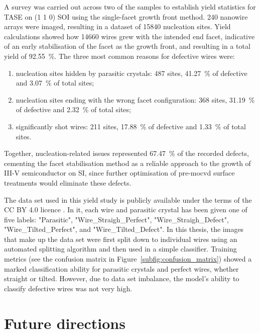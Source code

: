 A survey was carried out across two of the samples to establish yield statistics for \acs{TASE} on \hkl(1 1 0) \acs{SOI} using the single-facet  growth front method. \num{240} nanowire arrays were imaged, resulting in a dataset of \num{15840} nucleation sites. Yield calculations showed how \num{14660} wires grew with the intended end facet, indicative of an early stabilisation of the  facet as the growth front, and resulting in a total yield of \qty{92.55}{\%}. The three most common reasons for defective wires were:

\begin{enumerate}
    \item nucleation sites hidden by parasitic crystals: \num{487} sites, \qty{41.27}{\percent} of defective and \qty{3.07}{\percent} of total sites;
    \item nucleation sites ending with the wrong facet configuration: \num{368} sites, \qty{31.19}{\percent} of defective and \qty{2.32}{\percent} of total sites;
    \item significantly shot wires: \num{211} sites, \qty{17.88}{\percent} of defective and \qty{1.33}{\percent} of total sites.
\end{enumerate}

Together, nucleation-related issues represented \qty{67.47}{\percent} of the recorded defects, cementing the facet stabilisation method as a reliable approach to the growth of III-V semiconductor on \acl{SI}, since further optimisation of pre-\acs{mocvd} surface treatments would eliminate these defects.

The data set used in this yield study is publicly available \cite{dataset} under the terms of the CC BY 4.0 licence \cite{CCBY40}. In it, each wire and parasitic crystal has been given one of five labels: "Parasitic", "Wire\_Straigh\_Perfect", "Wire\_Straigh\_Defect", "Wire\_Tilted\_Perfect", and "Wire\_Tilted\_Defect". In this thesis, the images that make up the data set were first split down to individual wires using an automated splitting algorithm \cite{code} and then used in a simple classifier. Training metrics (see the confusion matrix in Figure~\ref{subfig:confusion_matrix}) showed a marked classification ability for parasitic crystals and perfect wires, whether straight or tilted. However, due to data set imbalance, the model's ability to classify defective wires was not very high.

\section{Future directions}

